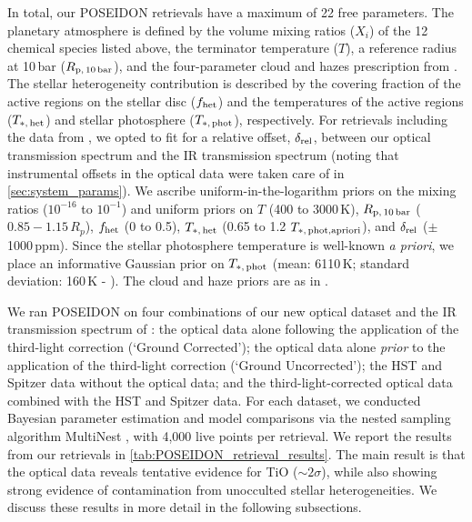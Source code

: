 \documentclass[twocolumn]{aastex63}
\begin{document}
In total, our POSEIDON retrievals have a maximum of 22 free parameters. The planetary atmosphere is defined by the volume mixing ratios ($X_i$) of the 12 chemical species listed above, the terminator temperature ($T$), a reference radius at 10\,bar ($R_{\rm{p, \, 10\,bar}}$), and the four-parameter cloud and hazes prescription from \cite{MacDonald2017}. The stellar heterogeneity contribution is described by the covering fraction of the active regions on the stellar disc ($f_{\rm{het}}$) and the temperatures of the active regions ($T_{*, \, \rm{het}}$) and stellar photosphere ($T_{*, \, \rm{phot}}$), respectively. For retrievals including the data from \citet{Kreidberg2018}, we opted to fit for a relative offset, $\delta_{\rm rel}$, between our optical transmission spectrum and the IR transmission spectrum (noting that instrumental offsets in the optical data were taken care of in \autoref{sec:system_params}). We ascribe uniform-in-the-logarithm priors on the mixing ratios ($10^{-16}$ to $10^{-1}$) and uniform priors on $T$ (400 to 3000\,K), $R_{\rm{p, \, 10 \, bar}}$ ($0.85 - 1.15\,R_p$), $f_{\rm{het}}$ (0 to 0.5), $T_{*, \, \rm{het}}$ (0.65 to 1.2 $T_{*, \, \rm{phot}, \rm{a priori}}$), and $\delta_{\rm rel}$ ($\pm$ 1000\,ppm). Since the stellar photosphere temperature is well-known \textit{a priori}, we place an informative Gaussian prior on $T_{*, \, \rm{phot}}$ (mean: 6110\,K; standard deviation: 160\,K - \citealp{Gillon2014}). The cloud and haze priors are as in \citet{MacDonald2017}.

We ran POSEIDON on four combinations of our new optical dataset and the IR transmission spectrum of \cite{Kreidberg2018}: the optical data alone following the application of the third-light correction (`Ground Corrected'); the optical data alone \textit{prior} to the application of the third-light correction (`Ground Uncorrected'); the HST and Spitzer data without the optical data; and the third-light-corrected optical data combined with the HST and Spitzer data. For each dataset, we conducted Bayesian parameter estimation and model comparisons via the nested sampling algorithm MultiNest \citep{Feroz2008,Feroz2009,Feroz2019,Buchner2014}, with 4,000 live points per retrieval. We report the results from our retrievals in \autoref{tab:POSEIDON_retrieval_results}. The main result is that the optical data reveals tentative evidence for TiO ($\sim 2\sigma$), while also showing strong evidence of contamination from unocculted stellar heterogeneities. We discuss these results in more detail in the following subsections.
\end{document}
